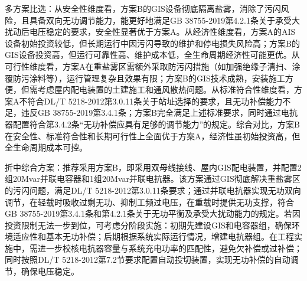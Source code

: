 \documentclass[11pt,a4paper]{ctexart}
\begin{document}
\begin{description}[leftmargin=1.5em,style=nextline,font=\normalfont]
多方案比选：从安全性维度看，方案B的GIS设备彻底隔离盐雾，消除了污闪风险，且具备双向无功调节能力，能更好地满足GB 38755-2019第4.2.1条关于承受大扰动后电压稳定的要求，安全性显著优于方案A。从经济性维度看，方案A的AIS设备初始投资较低，但长期运行中因污闪导致的维护和停电损失风险高；方案B的GIS设备投资高，但运行可靠性高、维护成本低，全生命周期经济性可能更优。从可行性维度看，方案A在重盐雾区需额外采取防污闪措施（如加强绝缘子清扫、涂覆防污涂料等），运行管理复杂且效果有限；方案B的GIS技术成熟，安装施工方便，但需考虑屋内配电装置的土建施工和通风散热问题。从标准符合性维度看，方案A不符合DL/T 5218-2012第3.0.11条关于站址选择的要求，且无功补偿能力不足，违反GB 38755-2019第3.4.1条；方案B完全满足上述标准要求，同时通过电抗器配置符合第3.4.2条“无功补偿应具有足够的调节能力”的规定。综合对比，方案B在安全性、标准符合性和长期可行性上全面优于方案A，经济性虽初始投资高，但全生命周期成本可控。

折中综合方案：推荐采用方案B，即采用双母线接线、屋内GIS配电装置，并配置2组20Mvar并联电容器和1组20Mvar并联电抗器。该方案通过GIS彻底解决重盐雾区的污闪问题，满足DL/T 5218-2012第3.0.11条要求；通过并联电抗器实现无功双向调节，在轻载时吸收过剩无功、抑制工频过电压，在重载时提供无功支撑，符合GB 38755-2019第3.4.1条和第4.2.1条关于无功平衡及承受大扰动能力的规定。若因投资限制无法一步到位，可考虑分阶段实施：初期先建设GIS和电容器组，确保环境适应性和基本无功补偿；后期根据系统实际运行情况，增建电抗器组。在工程实施中，需进一步校核电抗器容量与系统充电功率的匹配性，避免欠补偿或过补偿；同时按照DL/T 5218-2012第7.2节要求配置自动投切装置，实现无功补偿的自动调节，确保电压稳定。


\end{description}
\end{document}
